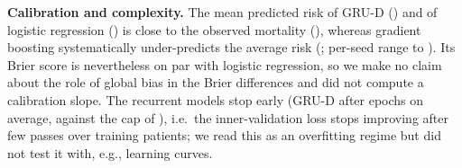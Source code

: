 \begin{table}[t]\centering\caption{Pooled out-of-fold AUROC by ICU type (CCU coronary care, CSRU cardiac-surgery recovery, MICU medical, SICU surgical), mean $\pm$ sd over seeds.}\label{tab:icu}
\end{table}

\textbf{Calibration and complexity.} The mean predicted risk of GRU-D () and of logistic regression () is close to the observed mortality (), whereas gradient boosting systematically under-predicts the average risk (; per-seed range  to ). Its Brier score is nevertheless on par with logistic regression, so we make no claim about the role of global bias in the Brier differences and did not compute a calibration slope. The recurrent models stop early (GRU-D after  epochs on average, against the cap of ), i.e.\ the inner-validation loss stops improving after few passes over  training patients; we read this as an overfitting regime but did not test it with, e.g., learning curves.
